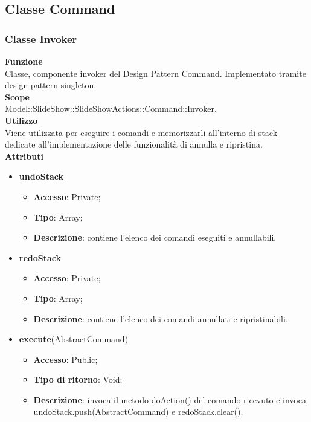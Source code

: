 \subsection{Classe Command}{
	\subsubsection{Classe Invoker}{
	\textbf{Funzione}\\
		\indent Classe, componente invoker del Design Pattern Command. Implementato tramite design pattern singleton.\\
	\textbf{Scope}\\
		\indent Model::SlideShow::SlideShowActions::Command::Invoker.\\
	\textbf{Utilizzo}\\
		\indent Viene utilizzata per eseguire i comandi e memorizzarli all’interno di stack dedicate all’implementazione delle funzionalità di annulla e ripristina.\\
	\textbf{Attributi}
	\begin{itemize}
		\item \textbf{undoStack}
		\begin{itemize}
			\item \textbf{Accesso}: Private;
			\item \textbf{Tipo}: Array;
			\item \textbf{Descrizione}: contiene l’elenco dei comandi eseguiti e annullabili.
		\end{itemize}
		\item \textbf{redoStack}
		\begin{itemize}
			\item \textbf{Accesso}: Private;
			\item \textbf{Tipo}: Array;
			\item \textbf{Descrizione}: contiene l’elenco dei comandi annullati e ripristinabili.
		\end{itemize}
	\end{itemize}
	\begin{itemize}
		\item \textbf{execute}(AbstractCommand)
		\begin{itemize}
			\item \textbf{Accesso}: Public;
			\item \textbf{Tipo di ritorno}: Void;
			\item \textbf{Descrizione}: invoca il metodo doAction() del comando ricevuto e invoca
			undoStack.push(AbstractCommand) e redoStack.clear().

\end{itemize}
\end{itemize}}}
